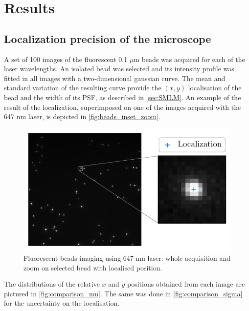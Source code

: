 \section{Results} \label{sec:results}
\subsection{Localization precision of the microscope} \label{sec:results_beads}
A set of 100 images of the fluorescent 0.1 $\mu$m beads was acquired for each of the laser wavelengths.
An isolated bead was selected and its intensity profile was fitted in all images with a two-dimensional gaussian curve. 
The mean and standard variation of the resulting curve provide the $(x,y)$ localisation of the bead and the width of its PSF, as described in \autoref{sec:SMLM}.
An example of the result of the localization, superimposed on one of the images acquired with the 647 nm laser, is depicted in \autoref{fig:beads_inset_zoom}.
\begin{figure}[htbp]
    \centering
    \includegraphics[scale=1]{figures/beads_inset_zoom.pdf}
    \caption{Fluorescent beads imaging using 647 nm laser: whole acquisition  and zoom on selected bead with localised position.}
    \label{fig:beads_inset_zoom}
\end{figure}
The distributions of the relative $x$ and $y$ positions obtained from each image are pictured in \autoref{fig:comparison_mu}.
The same was done in \autoref{fig:comparison_sigma} for the uncertainty on the localisation.
